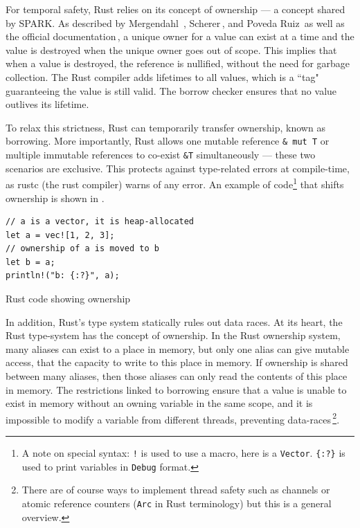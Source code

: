 \documentclass[nomenclature, english, bibtex]{kththesis}
\newcommand{\inlinecode}[1]{\texttt{#1}}
\begin{document}
For temporal safety, Rust relies on its concept of ownership --- a concept shared by SPARK. As described by Mergendahl \etal\,\cite{mergendahl_cross-language_2022}, Scherer\,\cite{scherer_engineering_2021}, and Poveda Ruiz\,\cite{poveda_ruiz_bounded_2019} as well as the official documentation\,\cite{noauthor_rust_nodate}, a unique owner for a value can exist at a time and the value is destroyed when the unique owner goes out of scope.  This implies that when a value is destroyed, the reference is nullified, without the need for garbage collection. The Rust compiler adds lifetimes to all values, which is a ``tag" guaranteeing the value is still valid. The borrow checker ensures that no value outlives its lifetime.

To relax this strictness, Rust can temporarily transfer ownership, known as borrowing. More importantly, Rust allows one mutable reference \inlinecode{\& mut T} or multiple immutable references to co-exist \inlinecode{\&T} simultaneously --- these two scenarios are exclusive. This  protects against type-related errors at compile-time, as rustc (the rust compiler) warns of any error. An example of code\footnote{A note on special syntax: \texttt{!} is used to use a macro, here is a \texttt{Vector}. \texttt{\{:?\}} is used to print variables in \texttt{Debug} format.} that shifts ownership is shown in .

\begin{listing}[!ht]
\begin{verbatim}
// a is a vector, it is heap-allocated
let a = vec![1, 2, 3]; 
// ownership of a is moved to b
let b = a;             
println!("b: {:?}", a);
\end{verbatim}
\caption[Rust code showing ownership]{Rust code showing ownership}
\label{lst:rust_ownership}
\end{listing}

In addition, Rust’s type system statically rules out data races. At its heart, the Rust type-system has the concept of ownership. In the Rust ownership system, many aliases can exist to a place in memory, but only one alias can give mutable access, that the capacity to write to this place in memory. If ownership is shared between many aliases, then those aliases can only read the contents of this place in memory. The restrictions linked to borrowing ensure that a value is unable to exist in memory without an owning variable in the same scope, and it is impossible to modify a variable from different threads, preventing data-races\,\cite{poveda_ruiz_bounded_2019,noauthor_rust_nodate}\footnote{There are of course ways to implement thread safety such as channels or atomic reference counters (\texttt{Arc} in Rust terminology) but this is a general overview.}. 
\end{document}
